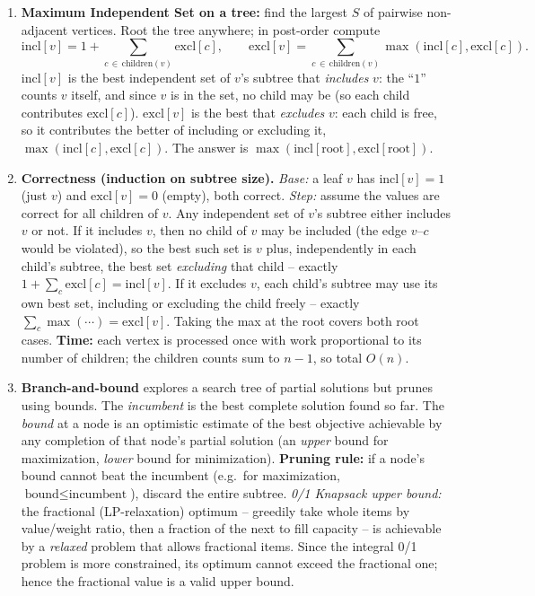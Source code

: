 \documentclass[11pt]{article}
\begin{document}
\begin{enumerate}[label=\textbf{A\arabic*.}, leftmargin=2.2em]
\item \textbf{Maximum Independent Set on a tree:} find the largest $S$ of
pairwise non-adjacent vertices. Root the tree anywhere; in post-order compute
\[
\mathrm{incl}[v] = 1 + \sum_{c\,\in\,\mathrm{children}(v)} \mathrm{excl}[c],
\qquad
\mathrm{excl}[v] = \sum_{c\,\in\,\mathrm{children}(v)} \max(\mathrm{incl}[c], \mathrm{excl}[c]).
\]
$\mathrm{incl}[v]$ is the best independent set of $v$'s subtree that
\emph{includes} $v$: the ``$1$'' counts $v$ itself, and since $v$ is in the set,
no child may be (so each child contributes $\mathrm{excl}[c]$).
$\mathrm{excl}[v]$ is the best that \emph{excludes} $v$: each child is free, so
it contributes the better of including or excluding it,
$\max(\mathrm{incl}[c],\mathrm{excl}[c])$. The answer is
$\max(\mathrm{incl}[\text{root}], \mathrm{excl}[\text{root}])$.

\item \textbf{Correctness (induction on subtree size).} \emph{Base:} a leaf $v$
has $\mathrm{incl}[v]=1$ (just $v$) and $\mathrm{excl}[v]=0$ (empty), both
correct. \emph{Step:} assume the values are correct for all children of $v$. Any
independent set of $v$'s subtree either includes $v$ or not. If it includes $v$,
then no child of $v$ may be included (the edge $v$--$c$ would be violated), so
the best such set is $v$ plus, independently in each child's subtree, the best
set \emph{excluding} that child -- exactly $1 + \sum_c \mathrm{excl}[c] =
\mathrm{incl}[v]$. If it excludes $v$, each child's subtree may use its own best
set, including or excluding the child freely -- exactly $\sum_c \max(\cdots) =
\mathrm{excl}[v]$. Taking the max at the root covers both root cases.
\textbf{Time:} each vertex is processed once with work proportional to its
number of children; the children counts sum to $n-1$, so total $O(n)$.

\item \textbf{Branch-and-bound} explores a search tree of partial solutions but
prunes using bounds. The \emph{incumbent} is the best complete solution found so
far. The \emph{bound} at a node is an optimistic estimate of the best objective
achievable by any completion of that node's partial solution (an \emph{upper}
bound for maximization, \emph{lower} bound for minimization). \textbf{Pruning
rule:} if a node's bound cannot beat the incumbent (e.g.\ for maximization,
$\text{bound} \le \text{incumbent}$), discard the entire subtree. \emph{0/1
Knapsack upper bound:} the fractional (LP-relaxation) optimum -- greedily take
whole items by value/weight ratio, then a fraction of the next to fill capacity
-- is achievable by a \emph{relaxed} problem that allows fractional items.
Since the integral 0/1 problem is more constrained, its optimum cannot exceed
the fractional one; hence the fractional value is a valid upper bound.


\end{enumerate}
\end{document}
